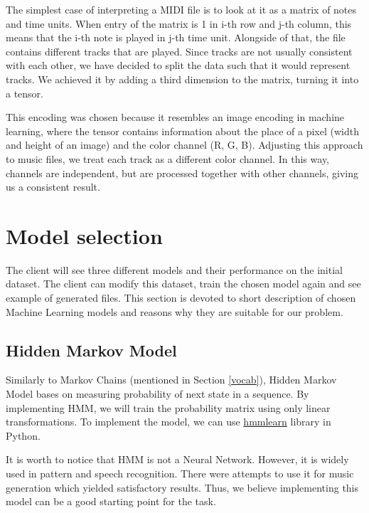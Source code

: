 \documentclass{article}
\begin{document}
The simplest case of interpreting a MIDI file is to look at it as a matrix of notes and time units. When entry of the matrix is 1 in i-th row and j-th column, this means that the i-th note is played in j-th time unit. Alongside of that, the file contains different tracks that are played. Since tracks are not usually consistent with each other, we have decided to split the data such that it would represent tracks. We achieved it by adding a third dimension to the matrix, turning it into a tensor.

This encoding was chosen because it resembles an image encoding in machine learning, where the tensor contains information about the place of a pixel (width and height of an image) and the color channel (R, G, B). Adjusting this approach to music files, we treat each track as a different color channel. In this way, channels are independent, but are processed together with other channels, giving us a consistent result.

\section{Model selection} \label{models}

The client will see three different models and their performance on the initial dataset. The client can modify this dataset, train the chosen model again and see example of generated files. This section is devoted to short description of chosen Machine Learning models and reasons why they are suitable for our problem.

\subsection{Hidden Markov Model}

Similarly to Markov Chains (mentioned in Section \ref{vocab}), Hidden Markov Model bases on measuring probability of next state in a sequence. By implementing HMM, we will train the probability matrix using only linear transformations. To implement the model, we can use \href{https://hmmlearn.readthedocs.io/en/latest/tutorial.html#available-models}{hmmlearn} library in Python.

It is worth to notice that HMM is not a Neural Network. However, it is widely used in pattern and speech recognition. There were attempts to use it for music generation \cite{Li_2019} which yielded satisfactory results. Thus, we believe implementing this model can be a good starting point for the task.
\end{document}
